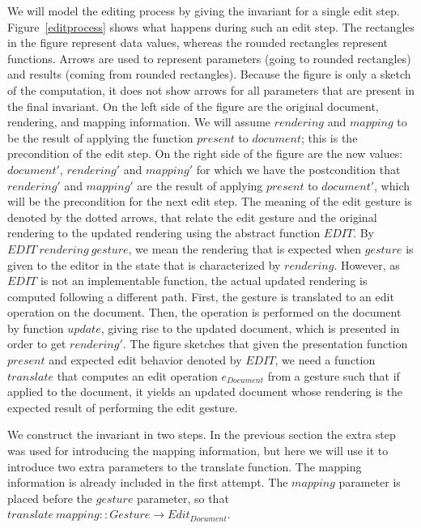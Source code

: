 We will model the editing process by giving the invariant for a single edit step. Figure~\ref{editprocess} shows what happens during such an edit step. The rectangles in the figure represent data values, whereas the rounded rectangles represent functions. Arrows are used to represent parameters (going to rounded rectangles) and results (coming from rounded rectangles). Because the figure is only a sketch of the computation, it does not show arrows for all parameters that are present in the final invariant. On the left side of the figure are the original document, rendering, and mapping information. We will assume $rendering$ and $mapping$ to be the result of applying the function $present$ to $document$; this is the precondition of the edit step. On the right side of the figure are the new values: $document'$, $rendering'$ and $mapping'$ for which we have the postcondition that $rendering'$ and $mapping'$ are the result of applying $present$ to $document'$, which will be the precondition for the next edit step. The meaning of the edit gesture is denoted by the dotted arrows, that relate the edit gesture and the original rendering to the updated rendering using the abstract function $EDIT$. By $EDIT~rendering~gesture$, we mean the rendering that is expected when $gesture$ is given to the editor in the state that is characterized by $rendering$. However, as $EDIT$ is not an implementable function, the actual updated rendering is computed following a different path. First, the gesture is translated to an edit operation on the document. Then, the operation is performed on the document by function $update$, giving rise to the updated document, which is presented in order to get $rendering'$. The figure sketches that given the presentation function $present$ and expected edit behavior denoted by $EDIT$, we need a function $translate$ that computes an edit operation $e_{Document}$ from a gesture such that if applied to the document, it yields an updated document whose rendering is the expected result of performing the edit gesture.
        

We construct the invariant in two steps. In the previous section the extra step was used for introducing the mapping information, but here we will use it to introduce two extra parameters to the translate function. The mapping information is already included in the first attempt. The $mapping$ parameter is placed before the $gesture$ parameter, so that $translate~mapping :: Gesture \rightarrow Edit_{Document}$.

